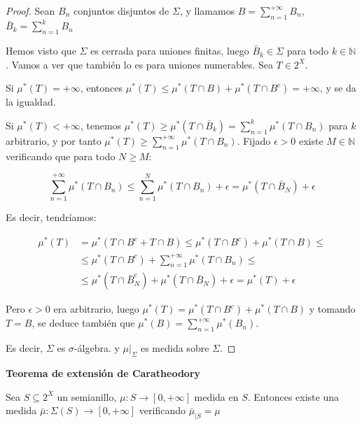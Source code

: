 \begin{proof}
 Sean $B_n$ conjuntos disjuntos de $\Sigma$, y llamamos $B = \sum_{n=1}^{+\infty} B_n$, $\bar{B}_k = \sum_{n=1}^{k} B_n$
 
 Hemos visto que $\Sigma$ es cerrada para uniones finitas, luego $\bar{B}_k \in \Sigma$ para todo $k\in \mathbb{N}$.
 Vamos a ver que también lo es para uniones numerables. Sea $T\in 2^X$.
 

 Si $\mu^\ast(T) = +\infty$, entonces $\mu^\ast(T) \le \mu^\ast(T\cap B ) + \mu^\ast(T\cap B^c) = +\infty$, y se da
 la igualdad.
 
 Si $\mu^\ast(T) < +\infty$, tenemos $\mu^\ast(T) \ge \mu^\ast(T\cap \bar{B}_k) = \sum_{n=1}^k \mu^\ast(T\cap B_n)$
 para $k$ arbitrario, y por tanto $\mu^\ast(T) \ge \sum_{n=1}^{+\infty} \mu^\ast(T\cap B_n)$. Fijado $\epsilon > 0$
 existe $M\in \mathbb{N}$ verificando que para todo $N\ge M$:
 
 \[\sum_{n=1}^{+\infty} \mu^\ast(T\cap B_n) \le \sum_{n=1}^N \mu^\ast(T\cap B_n) + \epsilon = 
   \mu^\ast(T\cap \bar{B}_N) + \epsilon\]
 
 Es decir, tendríamos:
 
 \begin{align*}
  \mu^\ast(T) &=   \mu^\ast(T\cap B^c + T\cap B) \le \mu^\ast(T\cap B^c) + \mu^\ast(T\cap B) \le \\
              &\le \mu^\ast(T\cap B^c) + \sum_{n=1}^{+\infty}\mu^\ast(T\cap B_n) \le \\
              &\le \mu^\ast(T\cap \bar{B}_N^c) + \mu^\ast(T\cap \bar{B}_N) + \epsilon
                =  \mu^\ast(T) + \epsilon
 \end{align*}

 Pero $\epsilon > 0$ era arbitrario, luego $\mu^\ast(T) = \mu^\ast(T\cap B^c) + \mu^\ast(T\cap B)$ y tomando 
 $T=B$, se deduce también que $\mu^\ast(B) = \sum_{n=1}^{+\infty}\mu^\ast(B_n)$.
 
 Es decir, $\Sigma$ es $\sigma$-álgebra. y $\mu|_{\Sigma}$ es medida sobre $\Sigma$.
 
\end{proof}


\begin{theorem} \textbf{Teorema de extensión de Caratheodory}

 Sea $S \subseteq 2^X$ un semianillo, $\mu:S \rightarrow [0,+\infty]$ medida en $S$. Entonces existe
 una medida $\bar{\mu}:\Sigma(S) \rightarrow [0,+\infty]$ verificando $\bar{\mu}_{|S} = \mu$
 
 \label{th:caratheodory}
\end{theorem}

